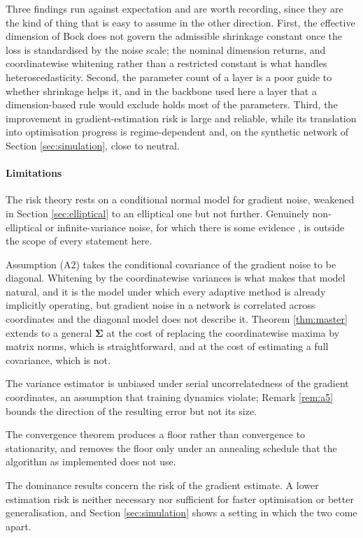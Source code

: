 \documentclass[pdflatex,sn-mathphys-num]{sn-jnl}%
\theoremstyle{thmstyleone}%
\theoremstyle{thmstyletwo}%
\theoremstyle{thmstylethree}%
\begin{document}
Three findings run against expectation and are worth recording, since they are the kind of thing that is easy to assume in the other direction. First, the effective dimension of Bock \cite{bock1975} does not govern the admissible shrinkage constant once the loss is standardised by the noise scale; the nominal dimension returns, and coordinatewise whitening rather than a restricted constant is what handles heteroscedasticity. Second, the parameter count of a layer is a poor guide to whether shrinkage helps it, and in the backbone used here a layer that a dimension-based rule would exclude holds most of the parameters. Third, the improvement in gradient-estimation risk is large and reliable, while its translation into optimisation progress is regime-dependent and, on the synthetic network of Section \ref{sec:simulation}, close to neutral.

\paragraph{Limitations}

The risk theory rests on a conditional normal model for gradient noise, weakened in Section \ref{sec:elliptical} to an elliptical one but not further. Genuinely non-elliptical or infinite-variance noise, for which there is some evidence \cite{simsekli2019, gurbuzbalaban2021}, is outside the scope of every statement here.

Assumption (A2) takes the conditional covariance of the gradient noise to be diagonal. Whitening by the coordinatewise variances is what makes that model natural, and it is the model under which every adaptive method is already implicitly operating, but gradient noise in a network is correlated across coordinates and the diagonal model does not describe it. Theorem \ref{thm:master} extends to a general $\bm\Sigma$ at the cost of replacing the coordinatewise maxima by matrix norms, which is straightforward, and at the cost of estimating a full covariance, which is not.

The variance estimator is unbiased under serial uncorrelatedness of the gradient coordinates, an assumption that training dynamics violate; Remark \ref{rem:a5} bounds the direction of the resulting error but not its size.

The convergence theorem produces a floor rather than convergence to stationarity, and removes the floor only under an annealing schedule that the algorithm as implemented does not use.

The dominance results concern the risk of the gradient estimate. A lower estimation risk is neither necessary nor sufficient for faster optimisation or better generalisation, and Section \ref{sec:simulation} shows a setting in which the two come apart.
\end{document}
